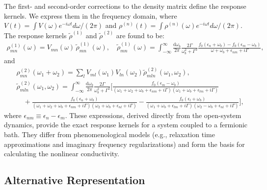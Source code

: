 \documentclass[twocolumn, prx, reprint, amsfonts, amsmath, amssymb, longbibliography, floatfix, aps]{revtex4-2}
\begin{document}
The first- and second-order corrections to the density matrix define the response kernels. We express them in the frequency domain, where $V(t) = \int V(\omega) e^{-i\omega t} d\omega / (2\pi)$ and $\rho^{(n)}(t) = \int \rho^{(n)}(\omega) e^{-i\omega t} d\omega / (2\pi)$. The response kernels $\tilde{\rho}^{(1)}$ and $\tilde{\rho}^{(2)}$ are found to be:
\begin{align}
\rho_{m n}^{(1)} (\omega) = V_{m n} (\omega) \, \tilde{\rho}_{m n}^{(1)} (\omega) ,
\quad
\tilde{\rho}_{m n}^{(1)} (\omega) = \int_{-\infty}^{\infty} \frac{\text{d} \omega_b}{2 \pi} \frac{ 2\Gamma } {\omega_b^2 + \Gamma^2}
\frac{ f_0(\epsilon_{n} + \omega_b ) - f_0(\epsilon_{m} - \omega_b )}
{ \omega + \omega_b + \epsilon_{n m} + i \Gamma } ,
\label{eq:SM_rho1}
\end{align}
and
\begin{align}
& \rho_{m n}^{(2)} (\omega_1 + \omega_2) = \sum_{l} V_{m l} (\omega_1) V_{l n} (\omega_2)
\tilde{\rho}_{m l n}^{(2)} (\omega_1, \omega_2) ,
\nonumber \\
& \tilde{\rho}_{m l n}^{(2)} (\omega_1,\omega_2) = \int_{-\infty}^{\infty} \frac{\text{d} \omega_b}{2 \pi} \frac{ 2 \Gamma }
{\omega_b^2 + \Gamma^2} \bigg[
\frac{f_0(\epsilon_{m} - \omega_b )}{ (\omega_1 + \omega_2 + \omega_b + \epsilon_{n m} + i \Gamma) (\omega_1 + \omega_b + \epsilon_{l m} + i \Gamma )}
\nonumber \\
& \quad + \frac{f_0(\epsilon_{n} + \omega_b )}{ ( \omega_1 + \omega_2 + \omega_b + \epsilon_{n m} + i \Gamma ) (\omega_2 + \omega_b + \epsilon_{n l} + i \Gamma )}
- \frac{ f_0(\epsilon_{l} + \omega_b ) }{ ( \omega_1 + \omega_b + \epsilon_{l m} + i \Gamma ) ( \omega_2 - \omega_b + \epsilon_{n l} + i \Gamma ) }
\bigg] ,
\label{eq:SM_rho2}
\end{align}
where $\epsilon_{nm} \equiv \epsilon_n - \epsilon_m$. These expressions, derived directly from the open-system dynamics, provide the exact response kernels for a system coupled to a fermionic bath. They differ from phenomenological models (e.g., relaxation time approximations and imaginary frequency regularizations) and form the basis for calculating the nonlinear conductivity.

\medskip
\subsection*{Alternative Representation}
\label{S-AA}
\end{document}

